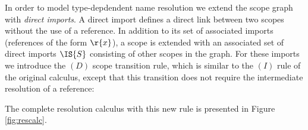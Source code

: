 In order to model type-depdendent name resolution we extend the scope graph with
\emph{direct imports}. A direct import defines a direct link between two scopes
without the use of a reference. In addition to its set of associated imports
(references of the form $\r{x}$), a scope is extended with an associated set of
direct imports $\IS{S}$ consisting of other scopes in the graph. For these
imports we introduce the $(D)$ scope transition rule, which is similar to the
$(I)$ rule of the original calculus, except that this transition does not
require the intermediate resolution of a reference:
\smallskip


\smallskip\noindent
The complete resolution calculus with this new rule is presented in Figure \ref{fig:rescalc}. 


